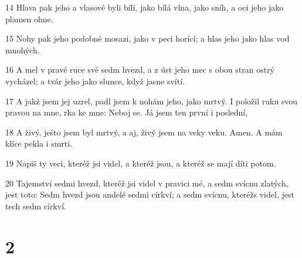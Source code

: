 \par 14 Hlava pak jeho a vlasové byli bílí, jako bílá vlna, jako sníh, a oci jeho jako plamen ohne.
\par 15 Nohy pak jeho podobné mosazi, jako v peci horící; a hlas jeho jako hlas vod mnohých.
\par 16 A mel v pravé ruce své sedm hvezd, a z úst jeho mec s obou stran ostrý vycházel; a tvár jeho jako slunce, když jasne svítí.
\par 17 A jakž jsem jej uzrel, padl jsem k nohám jeho, jako mrtvý. I položil ruku svou pravou na mne, rka ke mne: Neboj se. Já jsem ten první i poslední,
\par 18 A živý, ješto jsem byl mrtvý, a aj, živý jsem na veky veku. Amen. A mám klíce pekla i smrti.
\par 19 Napiš ty veci, kteréž jsi videl, a kteréž jsou, a kteréž se mají díti potom.
\par 20 Tajemství sedmi hvezd, kteréž jsi videl v pravici mé, a sedm svícnu zlatých, jest toto: Sedm hvezd jsou andelé sedmi církví; a sedm svícnu, kteréžs videl, jest tech sedm církví.

\chapter{2}

